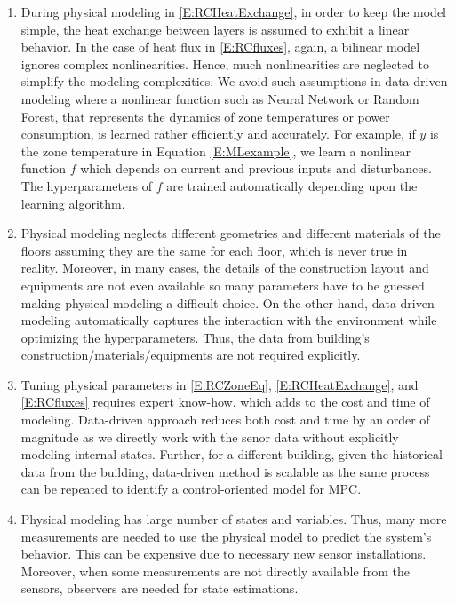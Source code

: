 \begin{enumerate}
	\item \textcolor[rgb]{0,0,1}{
	During physical modeling in \eqref{E:RCHeatExchange}, in order to keep the model simple, the heat exchange between layers is assumed to exhibit a linear behavior. 
	In the case of heat flux in \eqref{E:RCfluxes}, again, a bilinear model ignores complex nonlinearities.
	Hence, much nonlinearities are neglected to simplify the modeling complexities.
	We avoid such assumptions in data-driven modeling where a nonlinear function such as Neural Network or Random Forest, that represents the dynamics of zone temperatures or power consumption, is learned rather efficiently and accurately. 
	For example, if \(y\) is the zone temperature in Equation \eqref{E:MLexample}, we learn a nonlinear function \(f\) which depends on current and previous inputs and disturbances. 
	The hyperparameters of \(f\) are trained automatically depending upon the learning algorithm.}
	\item \textcolor[rgb]{0,0,1}{
	Physical modeling neglects different geometries and different materials of the floors assuming they are the same for each floor, which is never true in reality.
	Moreover, in many cases, the details of the construction layout and equipments are not even available so many parameters have to be guessed making physical modeling a difficult choice.
	On the other hand, data-driven modeling automatically captures the interaction with the environment while optimizing the hyperparameters. Thus, the data from building's construction/materials/equipments are not required explicitly.}
	\item \textcolor[rgb]{0,0,1}{
	Tuning physical parameters in \eqref{E:RCZoneEq}, \eqref{E:RCHeatExchange}, and \eqref{E:RCfluxes} requires expert know-how, which adds to the cost and time of modeling.
	Data-driven approach reduces both cost and time by an order of magnitude as we directly work with the senor data without explicitly modeling internal states.
	Further, for a different building, given the historical data from the building, data-driven method is scalable as the same process can be repeated to identify a control-oriented model for MPC.}
	\item \textcolor[rgb]{0,0,1}{
	Physical modeling has large number of states and variables.
	Thus, many more measurements are needed to use the physical model to predict the system's behavior.
	This can be expensive due to necessary new sensor installations.
	Moreover, when some measurements are not directly available from the sensors, observers are needed for state estimations.
}
\end{enumerate}
